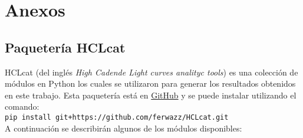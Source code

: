 \chapter*{\textbf{Anexos}}
\setcounter{chapter}{6}
\setcounter{equation}{0}
\setcounter{figure}{0}
\setcounter{table}{0}

\section*{Paquetería HCLcat}

HCLcat (del inglés \textit{High Cadende Light curves analityc tools}) es una colección de módulos en Python los cuales se utilizaron para generar los resultados obtenidos en este trabajo. Esta paquetería está en \href{https://github.com/ferwazz/HCLcat}{GitHub} y se puede instalar utilizando el comando:\\

\texttt{pip install git+https://github.com/ferwazz/HCLcat.git}\\

A continuación se describirán algunos de los módulos disponibles:

